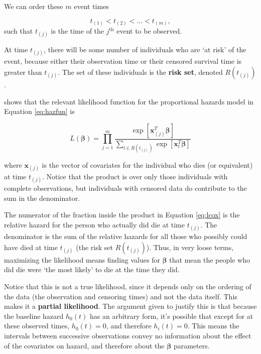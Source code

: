\documentclass[
  openany]{book}
\theoremstyle{definition}
\theoremstyle{definition}
\theoremstyle{definition}
\theoremstyle{definition}
\theoremstyle{remark}
\begin{document}
We can order these \(m\) event times

\[t_{(1)}< t_{(2)} < \ldots < t_{(m)},\]
such that \(t_{(j)}\) is the time of the \(j^{\text{th}}\) event to be observed.

At time \(t_{(j)}\), there will be some number of individuals who are `at risk' of the event, because either their observation time or their censored survival time is greater than \(t_{(j)}\). The set of these individuals is the \textbf{risk set}, denoted \(R\left(t_{(j)}\right)\).

\citet{cox1972regression} shows that the relevant likelihood function for the proportional hazards model in Equation \eqref{eq:hazfun} is

\begin{equation}
L\left(\boldsymbol\beta\right) = \prod\limits_{j=1}^m\frac{\exp\left[\mathbf{x}_{(j)}^T\boldsymbol\beta\right]}{\sum\limits_{l\in R\left(t_{(j)}\right)}{\exp\left[\mathbf{x}_l^T\boldsymbol\beta\right]}}
\label{eq:lcox}
\end{equation}

where \(\mathbf{x}_{(j)}\) is the vector of covariates for the individual who dies (or equivalent) at time \(t_{(j)}\). Notice that the product is over only those individuals with complete observations, but individuals with censored data do contribute to the sum in the denominator.

The numerator of the fraction inside the product in Equation \eqref{eq:lcox} is the relative hazard for the person who actually did die at time \(t_{(j)}\). The denominator is the sum of the relative hazards for all those who possibly could have died at time \(t_{(j)}\) (the risk set \(R\left(t_{(j)}\right)\)). Thus, in very loose terms, maximizing the likelihood means finding values for \(\boldsymbol\beta\) that mean the people who did die were `the most likely' to die at the time they did.

Notice that this is not a true likelihood, since it depends only on the ordering of the data (the observation and censoring times) and not the data itself. This makes it a \textbf{partial likelihood}. The argument given to justify this is that because the baseline hazard \(h_0\left(t\right)\) has an arbitrary form, it's possible that except for at these observed times, \(h_0\left(t\right)=0\), and therefore \(h_i\left(t\right)=0\). This means the intervals between successive observations convey no information about the effect of the covariates on hazard, and therefore about the \(\boldsymbol\beta\) parameters.
\end{document}
